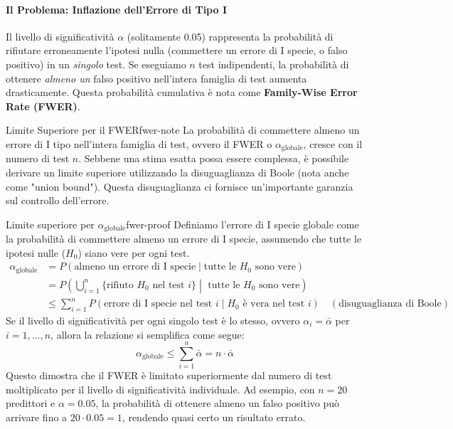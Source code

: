 \paragraph{Il Problema: Inflazione dell'Errore di Tipo I}
Il livello di significatività \(\alpha\) (solitamente 0.05) rappresenta la probabilità di rifiutare erroneamente l'ipotesi nulla (commettere un errore di I specie, o falso positivo) in un \textit{singolo} test. Se eseguiamo \(n\) test indipendenti, la probabilità di ottenere \textit{almeno un} falso positivo nell'intera famiglia di test aumenta drasticamente. Questa probabilità cumulativa è nota come \textbf{Family-Wise Error Rate (FWER)}.

\begin{nota}{Limite Superiore per il FWER}{fwer-note}
La probabilità di commettere almeno un errore di I tipo nell'intera famiglia di test, ovvero il FWER o \(\alpha_{\text{globale}}\), cresce con il numero di test \(n\). Sebbene una stima esatta possa essere complessa, è possibile derivare un limite superiore utilizzando la disuguaglianza di Boole (nota anche come "union bound"). Questa disuguaglianza ci fornisce un'importante garanzia sul controllo dell'errore.
\end{nota}

\begin{dimostrazione}{Limite superiore per \(\alpha_{\text{globale}}\)}{fwer-proof}
Definiamo l'errore di I specie globale come la probabilità di commettere almeno un errore di I specie, assumendo che tutte le ipotesi nulle (\(H_0\)) siano vere per ogni test.
\begin{align*}
\alpha_{\text{globale}} &= P(\text{almeno un errore di I specie} \mid \text{tutte le } H_0 \text{ sono vere}) \\
&= P\left(\bigcup_{i=1}^{n} \{\text{rifiuto } H_0 \text{ nel test } i\} \middle| \text{ tutte le } H_0 \text{ sono vere} \right) \\
&\leq \sum_{i=1}^{n} P(\text{errore di I specie nel test } i \mid H_0 \text{ è vera nel test } i) \quad (\text{disuguaglianza di Boole})
\end{align*}
Se il livello di significatività per ogni singolo test è lo stesso, ovvero \(\alpha_i = \bar{\alpha}\) per \(i=1, \dots, n\), allora la relazione si semplifica come segue:
\[
\alpha_{\text{globale}} \leq \sum_{i=1}^{n} \bar{\alpha} = n \cdot \bar{\alpha}
\]
Questo dimostra che il FWER è limitato superiormente dal numero di test moltiplicato per il livello di significatività individuale. Ad esempio, con \(n=20\) predittori e \(\alpha=0.05\), la probabilità di ottenere almeno un falso positivo può arrivare fino a \(20 \cdot 0.05 = 1\), rendendo quasi certo un risultato errato.
\end{dimostrazione}

